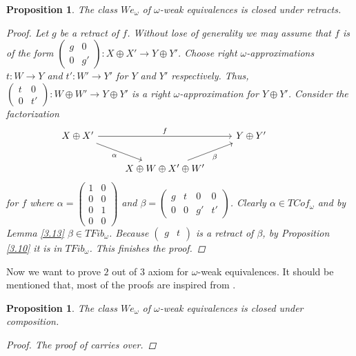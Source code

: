 \documentclass[12pt]{amsart}
\numberwithin{equation}{section}
\newtheorem{proposition}[lemma]{Proposition}
\theoremstyle{definition}
\newtheorem*{theorem 0*}{Theorem}
\newtheorem*{theorem a*}{Theorem A}
\newtheorem*{theorem b*}{Theorem B}
\numberwithin{diagram}{section}
\begin{document}
\begin{proposition}\label{3.14}
The class $We_{\omega}$ of $\omega$-weak equivalences is closed under retracts.
\begin{proof}
Let $g$ be a retract of $f$. Without lose of generality we may assume that $f$ is of the form $\begin{pmatrix}
g&0\\
0&g'
\end{pmatrix}:X\oplus X'\rightarrow Y\oplus Y'$.
Choose right $\omega$-approximations $t:W\rightarrow Y$ and $t':W'\rightarrow Y'$ for $Y$ and $Y'$ respectively. Thus,
$\begin{pmatrix}
t&0\\
0&t'
\end{pmatrix}:W\oplus W'\rightarrow Y\oplus Y'$ is a right $\omega$-approximation for $Y\oplus Y'$. Consider the factorization
\[\begin{tikzcd}
	{X\oplus X'} && {Y\oplus Y'} & {} \\
	& {X\oplus W\oplus X'\oplus W'} & {}
	\arrow["f", from=1-1, to=1-3]
	\arrow["\alpha"', from=1-1, to=2-2]
	\arrow["\beta"', from=2-2, to=1-3]
\end{tikzcd}\]
for $f$ where
$\alpha=\begin{pmatrix}
1&0\\0&0\\0&1\\0&0
\end{pmatrix}$ and $\beta=\begin{pmatrix}
g&t&0&0\\0&0&g'&t'
\end{pmatrix}$.
Clearly $\alpha\in TCof_{\omega}$ and by Lemma \ref{3.13} $\beta\in TFib_{\omega}$. Because $\begin{pmatrix}
g&t
\end{pmatrix}$ is a retract of $\beta$, by Proposition \ref{3.10} it is in $TFib_{\omega}$. This finishes the proof.
\end{proof}
\end{proposition}

Now we want to prove $2$ out of $3$ axiom for $\omega$-weak equivalences. It should be mentioned that, most of the proofs are inspired from \cite{CLZ}.

\begin{proposition}\label{3.15}
The class $We_{\omega}$ of $\omega$-weak equivalences is closed under composition.
\begin{proof}
The proof of \cite[Lemma 3.5]{CLZ} carries over.
\end{proof}
\end{proposition}
\end{document}
